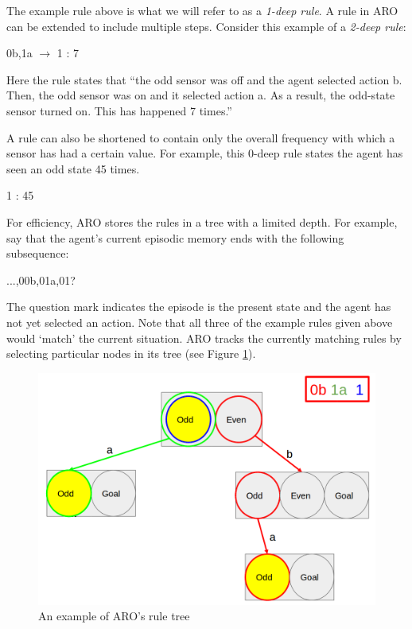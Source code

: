 \documentclass[letterpaper]{article} %
\begin{document}
The example rule above is what we will refer to as a \textit{1-deep rule}.  A
rule in ARO can be extended to include multiple steps.  Consider this
example of a \textit{2-deep rule}:

\begin{center}
   0b,1a $\rightarrow$ 1 : 7
\end{center}

Here the rule states that ``the odd sensor was off and the agent
selected action b.  Then, the odd sensor was on and it selected
action a.  As a result, the odd-state sensor turned on.  This has
happened 7 times.''

A rule can also be shortened to contain only the overall frequency
with which a sensor has had a certain value.  For example, this 0-deep
rule states the agent has seen an odd state 45 times.

\begin{center}
    1 : 45
\end{center}

For efficiency, ARO stores the rules in a tree with a limited depth.
For example, say that the agent's current episodic memory ends with
the following subsequence:

\begin{center}
    ...,00b,01a,01?
\end{center}
    
The question mark indicates the episode is the present state and the
agent has not yet selected an action.  Note that all three of the
example rules given above would `match' the current situation.  ARO
tracks the currently matching rules by selecting particular nodes in
its tree (see Figure \ref{fig3}).

\begin{figure}[t]
  \centering
  \includegraphics[width=0.9\columnwidth]{RuleTree.png} %
  \caption{An example of ARO's rule tree}
  \label{fig3}
\end{figure}
\end{document}
